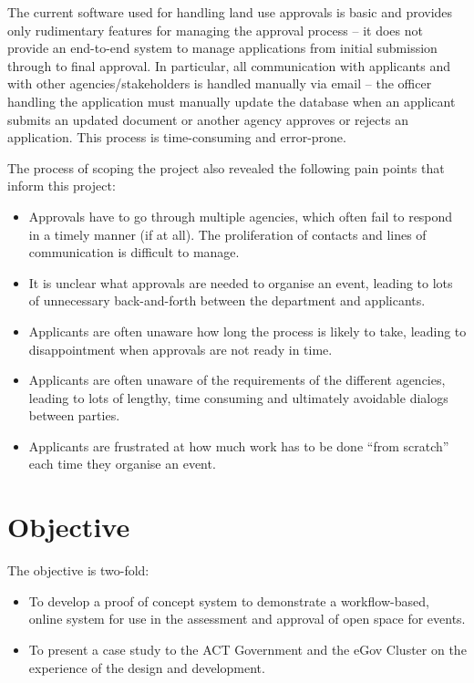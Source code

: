 \documentclass[12pt,a4paper,twosided]{article}
\begin{document}
The current software used for handling land use approvals is basic and
provides only rudimentary features for managing the approval process --
it does not provide an end-to-end system to manage applications from
initial submission through to final approval. In particular, all
communication with applicants and with other agencies/stakeholders is
handled manually via email -- the officer handling the application must
manually update the database when an applicant submits an updated
document or another agency approves or rejects an application. This
process is time-consuming and error-prone.

The process of scoping the project also revealed the following pain
points that inform this project:

\begin{itemize}
\itemsep1pt\parskip0pt
\item
  Approvals have to go through multiple agencies, which often fail to
  respond in a timely manner (if at all). The proliferation of contacts
  and lines of communication is difficult to manage.
\item
  It is unclear what approvals are needed to organise an event, leading
  to lots of unnecessary back-and-forth between the department and
  applicants.
\item
  Applicants are often unaware how long the process is likely to take,
  leading to disappointment when approvals are not ready in time.
\item
  Applicants are often unaware of the requirements of the different
  agencies, leading to lots of lengthy, time consuming and ultimately
  avoidable dialogs between parties.
\item
  Applicants are frustrated at how much work has to be done ``from
  scratch'' each time they organise an event.
\end{itemize}

\section{Objective}

The objective is two-fold:

\begin{itemize}
\itemsep1pt\parskip0pt
\item
  To develop a proof of concept system to demonstrate a workflow-based,
  online system for use in the assessment and approval of open space for
  events.
\item
  To present a case study to the ACT Government and the eGov Cluster on
  the experience of the design and development.
\end{itemize}
\end{document}
